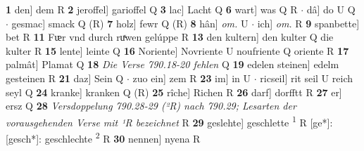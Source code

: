 \documentclass[8pt,a4paper,notitlepage]{article}
\begin{document}
\begin{table}[ht]
\begin{minipage}[t]{0.5\linewidth}
\textbf{1} den] dem R \textbf{2} jeroffel] garioffel Q \textbf{3} lac] Lacht Q \textbf{6} wart] was Q R  $\cdot$ dâ] do U Q  $\cdot$ gesmac] smack Q (R) \textbf{7} holz] fewr Q (R) \textbf{8} hân] \textit{om.} U  $\cdot$ ich] \textit{om.} R \textbf{9} spanbette] bet R \textbf{11} Fᵫr vnd durch ruͯwen gelúppe R \textbf{13} den kultern] den kulter Q die kulter R \textbf{15} lente] leinte Q \textbf{16} Noriente] Novriente U noufriente Q oriente R \textbf{17} palmât] Plamat Q \textbf{18} \textit{Die Verse 790.18-20 fehlen} Q  \textbf{19} edelen steinen] edelm gesteinen R \textbf{21} daz] Sein Q  $\cdot$ zuo ein] zem R \textbf{23} im] in U  $\cdot$ ricseil] rit seil U reich seyl Q \textbf{24} kranke] kranken Q (R) \textbf{25} rîche] Richen R \textbf{26} darf] dorfftt R \textbf{27} er] ersz Q \textbf{28} \textit{Versdoppelung 790.28-29 (²R) nach 790.29; Lesarten der vorausgehenden Verse mit ¹R bezeichnet} R  \textbf{29} geslehte] geschlette \textsuperscript{1}\hspace{-1.3mm} R [ge*]: [gesch*]: geschlechte \textsuperscript{2}\hspace{-1.3mm} R \textbf{30} nennen] nyena R \newline
\end{minipage}
\end{table}
\end{document}
